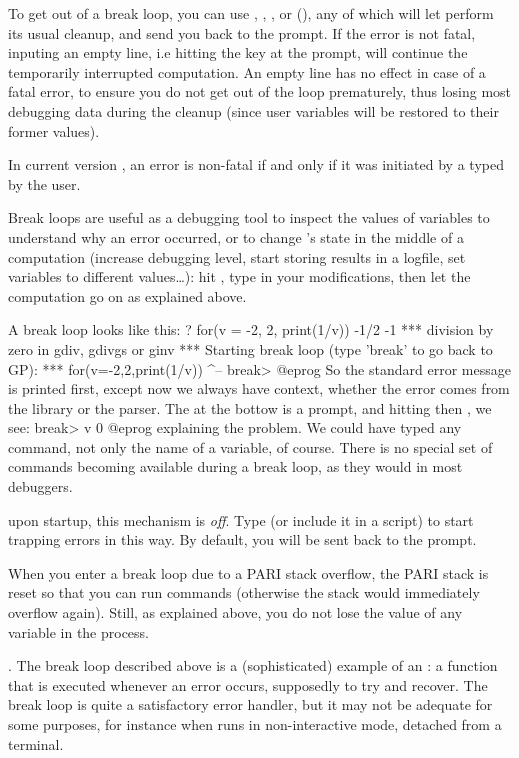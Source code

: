 To get out of a break loop, you can use , ,
, or  (), any of which will let  perform its
usual cleanup, and send you back to the  prompt. If the error is not fatal,
inputing an empty line, i.e hitting the  key at the
 prompt, will continue the temporarily interrupted computation.
An empty line has no effect in case of a fatal error, to ensure you do not
get out of the loop prematurely, thus losing most debugging data during the
cleanup (since user variables will be restored to their former values).

In current version \vers, an error is non-fatal if and only if it was
initiated by a  typed by the user.

Break loops are useful as a debugging tool to inspect the values of 
variables to understand why an error occurred, or to change 's state in the
middle of a computation (increase debugging level, start storing results in a
logfile, set variables to different values\dots): hit , type in your
modifications, then let the computation go on as explained above.

A break loop looks like this:
\bprog
? for(v = -2, 2, print(1/v))
-1/2
-1
  ***   division by zero in gdiv, gdivgs or ginv
  ***   Starting break loop (type 'break' to go back to GP):
  ***   for(v=-2,2,print(1/v))
                            ^--
break>
@eprog
\noindent So the standard error message is printed first, except now we always
have context, whether the error comes from the library or the parser. The
 at the bottow is a prompt, and hitting  then
, we see:
\bprog
break> v
0
@eprog
\noindent explaining the problem. We could have typed any  command, not
only the name of a variable, of course. There is no special set of commands
becoming available during a break loop, as they would in most debuggers.

 upon startup, this mechanism is \emph{off}. Type
 (or include it in a script) to start trapping errors in this
way. By default, you will be sent back to the prompt.

 When you enter a break loop due to a PARI stack
overflow, the PARI stack is reset so that you can run commands (otherwise the
stack would immediately overflow again). Still, as explained above, you do
not lose the value of any  variable in the process.

. The break loop described above is a (sophisticated)
example of an : a function that is executed whenever an
error occurs, supposedly to try and recover. The break loop is quite a
satisfactory error handler, but it may not be adequate for some purposes, for
instance when  runs in non-interactive mode, detached from a
terminal.

